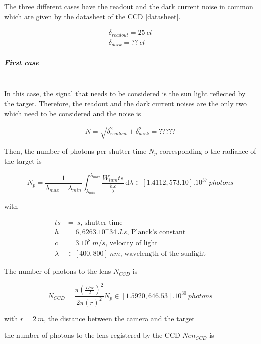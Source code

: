 The three different cases have the readout and the dark current noise in common which are given by the datasheet of the CCD \ref{datasheet}.

\begin{align}
\delta_{readout} = 25 \ el \label{eq:readout} \\
\delta_{dark} = ?? \ el \label{eq:darkcurrent}
\end{align}

\subparagraph{First case}
~\\
In this case, the signal that needs to be considered is the sun light reflected by the target. Therefore, the readout and the dark current noises are the only two which need to be considered and the noise is

\begin{equation}
\label{eq:Noise case1}
N = \sqrt{\delta_{readout}^2+\delta_{dark}^2} = ?????
\end{equation}

Then, the number of photons per shutter time $N_p$ corresponding o the radiance of the target is

\begin{equation}
\label{eq:Number Photons per Shutter Time case1}
N_p = \frac{1}{\lambda_{max}-\lambda_{min}}\int_{\lambda_{min}}^{\lambda_{max}} \frac{W_{lum}ts}{\frac{h.c}{\lambda}} \, \mathrm d\lambda \in [1.4112, 573.10].10^{37} \ photons
\end{equation}

with

\begin{align*}
ts & = \ s \mbox{, shutter time}  \\
h & = 6,6263.10^-34 \ J.s \mbox{, Planck's constant}  \\
c & = 3.10^8 \ m/s \mbox{, velocity of light} \\
\lambda & \in [400, 800] \ nm \mbox{, wavelength of the sunlight}
\end{align*}

The number of photons to the lens $N_{CCD}$ is

\begin{equation}
\label{eq:Number Photons case1}
N_{CCD}=\frac{\pi\left(\frac{Dsr}{2}\right)^2}{2\pi(r)^2}N_p \in [1.5920, 646.53].10^{30} \ photons
\end{equation}

with $r = 2\ m$, the distance between the camera and the target

the number of photons to the lens  registered by the CCD $Nen_{CCD}$ is

